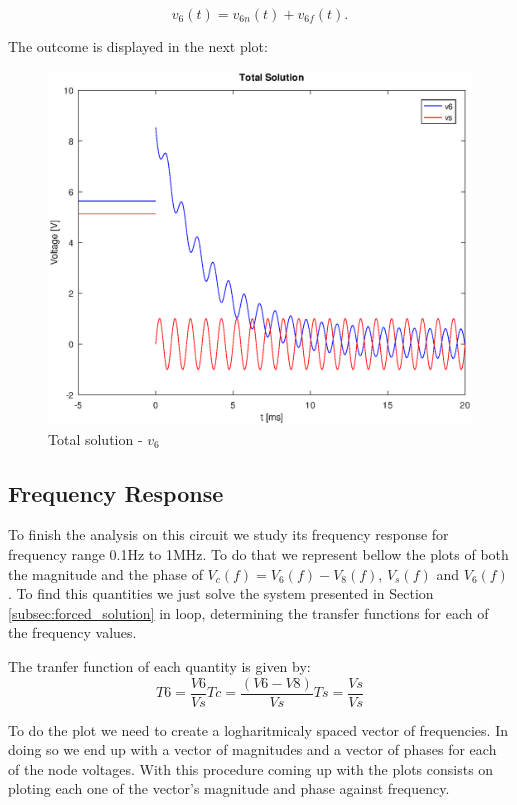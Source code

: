 \begin{equation}
  v_6(t) = v_{6n}(t) + v_{6f}(t).
  \label{eq:v6_sol}
\end{equation}

The outcome is displayed in the next plot:

\begin{figure}[H] \centering
\includegraphics[width=0.8\linewidth]{tot_sol.eps}
\caption{Total solution - $v_6$}
\label{fig:total solution}
\end{figure}


\newpage
\subsection{Frequency Response}
\label{subsec:frequency_response}

To finish the analysis on this circuit we study its frequency response for frequency range 0.1Hz to 1MHz. To do that we represent bellow the plots of both the magnitude and the phase of $V_{c}(f)=V_{6}(f)-V_{8}(f)$, $V_{s}(f)$ and $V_{6}(f)$.
To find this quantities we just solve the system presented in Section \ref{subsec:forced_solution} in loop, determining the transfer functions for each of the frequency values.
\par The tranfer function of each quantity is given by:
\begin{equation}
  T6=\frac{V6}{Vs}
  Tc=\frac{(V6-V8)}{Vs}
  Ts=\frac{Vs}{Vs}
\end{equation}

To do the plot we need to create a logharitmicaly spaced vector of frequencies. In doing so we end up with a vector of magnitudes and a vector of phases for each of the node voltages. With this procedure coming up with the plots consists on ploting each one of the vector's magnitude and phase against frequency.

